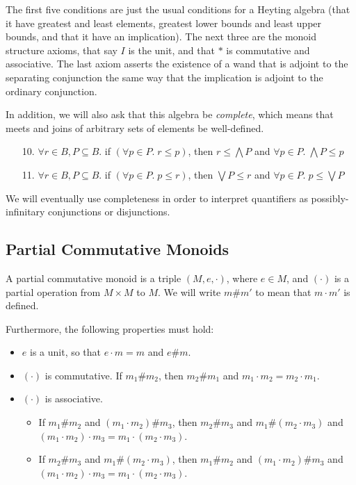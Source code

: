 The first five conditions are just the usual conditions for a Heyting
algebra (that it have greatest and least elements, greatest lower
bounds and least upper bounds, and that it have an implication). The
next three are the monoid structure axioms, that say $I$ is the unit,
and that $*$ is commutative and associative. The last axiom asserts
the existence of a wand that is adjoint to the separating conjunction
the same way that the implication is adjoint to the ordinary
conjunction.

In addition, we will also ask that this algebra be \emph{complete},
which means that meets and joins of arbitrary sets of elements be
well-defined.

\begin{enumerate}
\item[10.] $\forall r\in B, P \subseteq B.$ if $(\forall p \in P.\; r \leq p)$, then  
      $r \leq \bigwedge P $ and 
      $\forall p \in P.\; \bigwedge P \leq p$
\item[11.] $\forall r \in B, P \subseteq B.$ if $(\forall p \in P.\; p \leq r)$, then  
      $\bigvee P \leq r$ and 
      $\forall p \in P.\; p \leq \bigvee P$
\end{enumerate}

We will eventually use completeness in order to interpret quantifiers as 
possibly-infinitary conjunctions or disjunctions.
 
\subsection{Partial Commutative Monoids}

A partial commutative monoid is a triple $(M, e, \cdot)$, where $e \in
M$, and $(\cdot)$ is a partial operation from $M \times M$ to $M$. We
will write $m \# m'$ to mean that $m \cdot m'$ is defined. 

Furthermore, the following properties must hold:

\begin{itemize}
\item $e$ is a unit, so that $e \cdot m = m$ and $e \# m$. 
\item $(\cdot)$ is commutative. If $m_1 \# m_2$, then $m_2 \# m_1$ and $m_1 \cdot m_2 = m_2 \cdot m_1$. 
\item $(\cdot)$ is associative. 
  \begin{itemize}
  \item If $m_1 \# m_2$ and $(m_1 \cdot m_2) \# m_3$, then $m_2 \# m_3$ and $m_1 \# (m_2 \cdot m_3)$ and $(m_1 \cdot m_2) \cdot m_3 = m_1 \cdot (m_2 \cdot m_3)$.
  \item If $m_2 \# m_3$ and $m_1 \# (m_2 \cdot m_3)$, then $m_1 \# m_2$ and $(m_1 \cdot m_2) \# m_3$ and $(m_1 \cdot m_2) \cdot m_3 = m_1 \cdot (m_2 \cdot m_3)$.
  \end{itemize}
  
  
\end{itemize}

